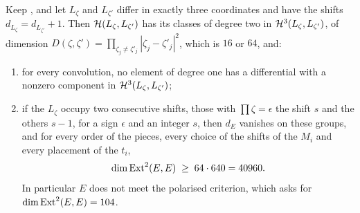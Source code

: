 \begin{theorem}\label{thm:efourtwolevels}
Keep , and let $L_{\zeta}$ and $L_{\zeta'}$ differ in
exactly three coordinates and have the shifts $d_{L_{\zeta}}=d_{L_{\zeta'}}+1$.
Then $\mathcal{H}(L_{\zeta},L_{\zeta'})$ has its classes of degree two in
$\mathcal{H}^{3}(L_{\zeta},L_{\zeta'})$, of dimension
$D(\zeta,\zeta')=\prod_{\zeta_{j}\ne\zeta'_{j}}|\zeta_{j}-\zeta'_{j}|^{2}$,
which is $16$ or $64$, and:
\begin{enumerate}[label=\textup{(\roman*)},leftmargin=2.6em,itemsep=2pt]
\item for every convolution, no element of degree one has a differential
  with a nonzero component in $\mathcal{H}^{3}(L_{\zeta},L_{\zeta'})$;
\item if the $L_{\zeta}$ occupy two consecutive shifts, those with
  $\prod\zeta=\epsilon$ the shift $s$ and the others $s-1$, for a sign
  $\epsilon$ and an integer $s$, then $d_{E}$ vanishes on these groups, and
  for every order of the pieces, every choice of the shifts of the $M_{i}$
  and every placement of the $t_{i}$,
  \[
    \dim\operatorname{Ext}^{2}(E,E)\;\ge\;64\cdot640=40960 .
  \]
  In particular $E$ does not meet the polarised criterion, which asks for
  $\dim\operatorname{Ext}^{2}(E,E)=104$.
\end{enumerate}
\end{theorem}

